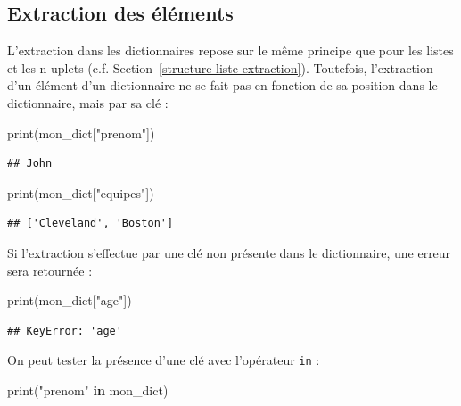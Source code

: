 \documentclass[
  12pt,
]{book}
\newenvironment{Shaded}{\begin{snugshade}}{\end{snugshade}}
\newcommand{\BuiltInTok}[1]{#1}
\newcommand{\KeywordTok}[1]{\textcolor[rgb]{0.13,0.29,0.53}{\textbf{#1}}}
\newcommand{\NormalTok}[1]{#1}
\newcommand{\StringTok}[1]{\textcolor[rgb]{0.31,0.60,0.02}{#1}}
\numberwithin{equation}{section}
\numberwithin{countremarque}{section}
\begin{document}
\subsection{Extraction des éléments}\label{extraction-des-uxe9luxe9ments-1}

L'extraction dans les dictionnaires repose sur le même principe que pour les listes et les n-uplets (c.f. Section~\ref{structure-liste-extraction}). Toutefois, l'extraction d'un élément d'un dictionnaire ne se fait pas en fonction de sa position dans le dictionnaire, mais par sa clé :

\begin{Shaded}
\begin{Highlighting}[]
\BuiltInTok{print}\NormalTok{(mon\_dict[}\StringTok{"prenom"}\NormalTok{])}
\end{Highlighting}
\end{Shaded}

\begin{lstlisting}
## John
\end{lstlisting}

\begin{Shaded}
\begin{Highlighting}[]
\BuiltInTok{print}\NormalTok{(mon\_dict[}\StringTok{"equipes"}\NormalTok{])}
\end{Highlighting}
\end{Shaded}

\begin{lstlisting}
## ['Cleveland', 'Boston']
\end{lstlisting}

Si l'extraction s'effectue par une clé non présente dans le dictionnaire, une erreur sera retournée :

\begin{Shaded}
\begin{Highlighting}[]
\BuiltInTok{print}\NormalTok{(mon\_dict[}\StringTok{"age"}\NormalTok{])}
\end{Highlighting}
\end{Shaded}

\begin{lstlisting}
## KeyError: 'age'
\end{lstlisting}

On peut tester la présence d'une clé avec l'opérateur \texttt{in} :

\begin{Shaded}
\begin{Highlighting}[]
\BuiltInTok{print}\NormalTok{(}\StringTok{"prenom"} \KeywordTok{in}\NormalTok{ mon\_dict)}
\end{Highlighting}
\end{Shaded}
\end{document}
